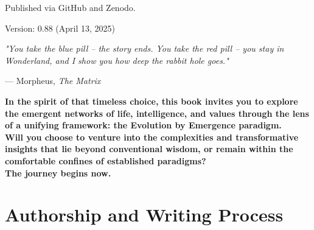 \documentclass[12pt,openany]{book}
\let\cleardoublepage\clearpage %
\begin{document}
\bigskip %

\noindent %
Published via GitHub and Zenodo.

\bigskip

\noindent %
Version: 0.88 (April 13, 2025) %


\vfill %
\cleardoublepage %

\thispagestyle{empty} %
\epigraph{
    \textit{"You take the blue pill – the story ends. You take the red pill – you stay in Wonderland, and I show you how deep the rabbit hole goes."}
}{
    --- Morpheus, \textit{The Matrix}
}

\vspace{1cm}

\begin{center}
\textbf{\Large In the spirit of that timeless choice, this book invites you to explore the emergent networks of life, intelligence, and values through the lens of a unifying framework: the Evolution by Emergence paradigm.\\[0.5em] Will you choose to venture into the complexities and transformative insights that lie beyond conventional wisdom, or remain within the comfortable confines of established paradigms?\\[1em] The journey begins now.} %
\end{center}
\cleardoublepage %

\frontmatter %
\maketitle %
\tableofcontents
\cleardoublepage

\mainmatter %

\chapter*{Authorship and Writing Process}
\end{document}
